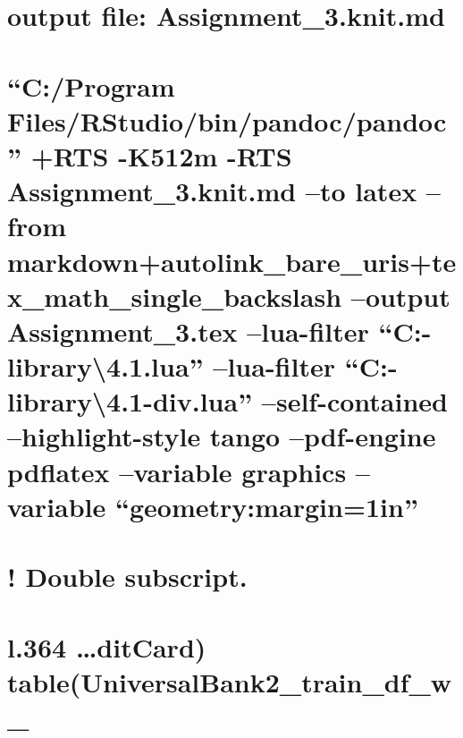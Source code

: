 \documentclass[
]{article}
\begin{document}
\hypertarget{output-file-assignment_3.knit.md}{%
\section{output file:
Assignment\_3.knit.md}\label{output-file-assignment_3.knit.md}}

\hypertarget{cprogram-filesrstudiobinpandocpandoc-rts--k512m--rts-assignment_3.knit.md-to-latex-from-markdownautolink_bare_uristex_math_single_backslash-output-assignment_3.tex-lua-filter-c-library4.1.lua-lua-filter-c-library4.1-div.lua-self-contained-highlight-style-tango-pdf-engine-pdflatex-variable-graphics-variable-geometrymargin1in}{%
\section{\texorpdfstring{``C:/Program Files/RStudio/bin/pandoc/pandoc''
+RTS -K512m -RTS Assignment\_3.knit.md --to latex --from
markdown+autolink\_bare\_uris+tex\_math\_single\_backslash --output
Assignment\_3.tex --lua-filter
``C:\Users\xlamo\Documents\R\win-library\textbackslash4.1\rmarkdown\rmarkdown\lua\pagebreak.lua''
--lua-filter
``C:\Users\xlamo\Documents\R\win-library\textbackslash4.1\rmarkdown\rmarkdown\lua\latex-div.lua''
--self-contained --highlight-style tango --pdf-engine pdflatex
--variable graphics --variable
``geometry:margin=1in''}{``C:/Program Files/RStudio/bin/pandoc/pandoc'' +RTS -K512m -RTS Assignment\_3.knit.md --to latex --from markdown+autolink\_bare\_uris+tex\_math\_single\_backslash --output Assignment\_3.tex --lua-filter ``C:-library\textbackslash4.1.lua'' --lua-filter ``C:-library\textbackslash4.1-div.lua'' --self-contained --highlight-style tango --pdf-engine pdflatex --variable graphics --variable ``geometry:margin=1in''}}\label{cprogram-filesrstudiobinpandocpandoc-rts--k512m--rts-assignment_3.knit.md-to-latex-from-markdownautolink_bare_uristex_math_single_backslash-output-assignment_3.tex-lua-filter-c-library4.1.lua-lua-filter-c-library4.1-div.lua-self-contained-highlight-style-tango-pdf-engine-pdflatex-variable-graphics-variable-geometrymargin1in}}

\hypertarget{double-subscript.}{%
\section{! Double subscript.}\label{double-subscript.}}

\hypertarget{l.364-ditcard-tableuniversalbank2_train_df_w_}{%
\section{l.364 \ldots ditCard)
table(UniversalBank2\_train\_df\_w\_}\label{l.364-ditcard-tableuniversalbank2_train_df_w_}}
\end{document}
